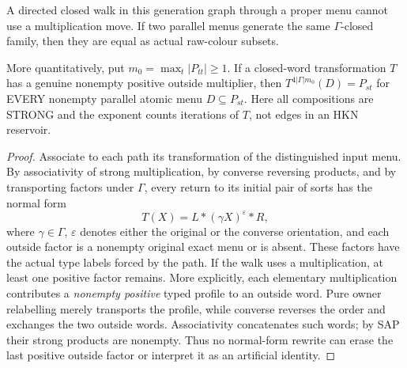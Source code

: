 \begin{lemma}
\label{lem:covariant-no-return}
A directed closed walk in this generation graph through a
proper menu cannot use a multiplication move.  If two parallel
menus generate the same $\Gamma$-closed family, then they are
equal as actual raw-colour subsets.

More quantitatively, put
$m_0=\max_t|P_{tt}|\ge1$.
If a closed-word transformation $T$ has a genuine
nonempty positive outside multiplier, then
$T^{4|\Gamma|m_0}(D)=P_{st}$ for EVERY nonempty
parallel atomic menu $D\subseteq P_{st}$.
Here all compositions are STRONG and the exponent
counts iterations of $T$, not edges in an HKN reservoir.
\end{lemma}
\begin{proof}
Associate to each path its transformation of the distinguished
input menu.  By associativity of strong multiplication, by converse
reversing products, and by transporting factors under $\Gamma$,
every return to its initial pair of sorts has the normal form
\[
       T(X)=L*(\gamma X)^\varepsilon*R,
\]
where $\gamma\in\Gamma$, $\varepsilon$ denotes either the
original or the converse orientation, and each outside factor is
a nonempty original exact menu or is absent.  These factors have
the actual type labels forced by the path.  If the walk uses a
multiplication, at least one positive factor remains.  More
explicitly, each elementary multiplication contributes a
\emph{nonempty positive} typed profile to an outside word.
Pure owner relabelling merely transports the profile, while
converse reverses the order and exchanges the two outside words.
Associativity concatenates such words; by SAP their strong products
are nonempty.  Thus no normal-form rewrite can erase the last
positive outside factor or interpret it as an artificial identity.


\end{proof}
